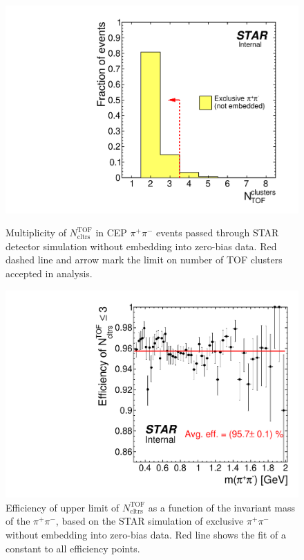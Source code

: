 \begin{figure}[ht!]%
	\centering%
	\begin{minipage}{.4725\textwidth}%
		\centering%
		\includegraphics[width=\linewidth]{graphics/corrections/NTofClusters2.pdf}%
		\caption[Multiplicity of $N^{\text{TOF}}_{\text{cltrs}}$ in simulated CEP $\pi^{+}\pi^{-}$ events.]{Multiplicity of $N^{\text{TOF}}_{\text{cltrs}}$ in CEP $\pi^{+}\pi^{-}$ events passed through STAR detector simulation without embedding into zero-bias data. Red dashed line and arrow mark the limit on number of TOF clusters accepted in analysis.}\label{fig:NTofClustersStarsim}
	\end{minipage}%
	\quad\quad%
	\begin{minipage}{.4725\textwidth}%
		\centering%
		\includegraphics[width=\linewidth]{graphics/corrections/NTofClustersCutEff.pdf}%
		\caption[Efficiency of upper limit of $N^{\text{TOF}}_{\text{cltrs}}$.]{Efficiency of upper limit of $N^{\text{TOF}}_{\text{cltrs}}$ as a function of the invariant mass of the $\pi^{+}\pi^{-}$, based on the STAR simulation of exclusive $\pi^{+}\pi^{-}$ without embedding into zero-bias data. Red line shows the fit of a constant to all efficiency points. }\label{fig:NTofClustersEff}
	\end{minipage}%
\end{figure}%



